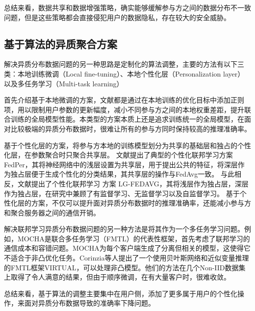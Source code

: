 总结来看，数据共享和数据增强策略，确实能够缓解参与方之间的数据分布不一致问题，但是这些策略都会直接侵犯用户的数据隐私，存在较大的安全威胁。

\subsection{基于算法的异质聚合方案}
解决异质分布数据问题的另一种思路是定制化的算法调整，主要的方法有以下三类：本地训练微调（Local fine-tuning）\cite{hanzely2020federated, t2020personalized, huang2021personalized}、本地个性化层（Personalization layer）以及多任务学习（Multi-task learning）

首先介绍基于本地微调的方案，文献\cite{li2020federated, hanzely2020federated, t2020personalized, huang2021personalized}都是通过在本地训练的优化目标中添加正则项，用以限制用户参数的更新幅度，减小不同参与方之间的本地权重差距，提升联合训练的全局模型性能。本类型的方案本质上还是追求训练统一的全局模型，在面对比较极端的异质分布数据时，很难让所有的参与方同时保持较高的推理准确率。

基于个性化层的方案，将参与方本地的训练模型划分为共享的基础层和独占的个性化层，在参数聚合时只聚合共享层。
文献\cite{arivazhagan2019federated}提出了典型的个性化联邦学习方案FedPer，其将神经网络中的浅层设置为共享层，用于提出公共的特征，将深层作为独占层便于生成个性化的分类结果，其共享层的操作与FedAvg一致。
与此相反，文献\cite{liang2020think}提出了个性化联邦学习
方案 LG-FEDAVG，其将浅层作为独占层，深层作为独占层，在研究中兼顾了有监督学习、无监督学习以及自监督学习。
基于个性化层的方案，不仅可以提升面对异质分布数据时的推理准确率，还能减小参与方和聚合服务器之间的通信开销。

解决联邦学习异质分布数据问题的另一种方法是将其作为一个多任务学习问题。例如，MOCHA\cite{smith2017federated}是联合多任务学习（FMTL）的代表性框架，首先考虑了联邦学习的通信成本和容错问题。MOCHA为每个客户端生成了分离但相关的模型，这使得它不适合于非凸优化任务。Corinzia等人\cite{corinzia2019variational}提出了一个使用贝叶斯网络和近似变量推理的FMTL框架VIRTUAL，可以处理非凸模型。他们的方法在几个Non-IID数据集上取得了令人满意的结果，但由于顺序微调，在有大量客户时，很难收敛。


总结来看，基于算法的调整主要集中在用户侧，添加了更多属于用户的个性化操作，来面对异质分布数据导致的准确率下降问题。

